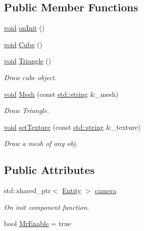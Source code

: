 \subsection*{Public Member Functions}
\begin{DoxyCompactItemize}
\item 
\mbox{\hyperlink{_s_d_l__opengles2__gl2ext_8h_ae5d8fa23ad07c48bb609509eae494c95}{void}} \mbox{\hyperlink{class_aspect_1_1_engine_1_1_mesh_render_a54bb4394dafdc30e919a0ba5d9854871}{on\+Init}} ()
\item 
\mbox{\hyperlink{_s_d_l__opengles2__gl2ext_8h_ae5d8fa23ad07c48bb609509eae494c95}{void}} \mbox{\hyperlink{class_aspect_1_1_engine_1_1_mesh_render_a31478e2366177bf2e3c98fe71c769c33}{Cube}} ()
\item 
\mbox{\hyperlink{_s_d_l__opengles2__gl2ext_8h_ae5d8fa23ad07c48bb609509eae494c95}{void}} \mbox{\hyperlink{class_aspect_1_1_engine_1_1_mesh_render_ae8ca6b05b335b228943f4c034c02100d}{Triangle}} ()
\begin{DoxyCompactList}\small\item\em Draw cube object. \end{DoxyCompactList}\item 
\mbox{\hyperlink{_s_d_l__opengles2__gl2ext_8h_ae5d8fa23ad07c48bb609509eae494c95}{void}} \mbox{\hyperlink{class_aspect_1_1_engine_1_1_mesh_render_a16ef5a49a05bd542a33a78e67b4e3067}{Mesh}} (const \mbox{\hyperlink{_s_d_l__opengl__glext_8h_ae84541b4f3d8e1ea24ec0f466a8c568b}{std\+::string}} \&\+\_\+mesh)
\begin{DoxyCompactList}\small\item\em Draw Triangle. \end{DoxyCompactList}\item 
\mbox{\hyperlink{_s_d_l__opengles2__gl2ext_8h_ae5d8fa23ad07c48bb609509eae494c95}{void}} \mbox{\hyperlink{class_aspect_1_1_engine_1_1_mesh_render_aadfc13cdafe27ff3f63e80e68fdfbaa0}{set\+Texture}} (const \mbox{\hyperlink{_s_d_l__opengl__glext_8h_ae84541b4f3d8e1ea24ec0f466a8c568b}{std\+::string}} \&\+\_\+texture)
\begin{DoxyCompactList}\small\item\em Draw a mesh of any obj. \end{DoxyCompactList}\end{DoxyCompactItemize}
\subsection*{Public Attributes}
\begin{DoxyCompactItemize}
\item 
std\+::shared\+\_\+ptr$<$ \mbox{\hyperlink{class_aspect_1_1_engine_1_1_entity}{Entity}} $>$ \mbox{\hyperlink{class_aspect_1_1_engine_1_1_mesh_render_acd7bb5d1bfd42ecfe1a3d94b12271068}{camera}}
\begin{DoxyCompactList}\small\item\em On init component function. \end{DoxyCompactList}\item 
bool \mbox{\hyperlink{class_aspect_1_1_engine_1_1_mesh_render_a242e0980538e23b839f7ad8434bb1aa7}{Mr\+Enable}} = true
\end{DoxyCompactItemize}

